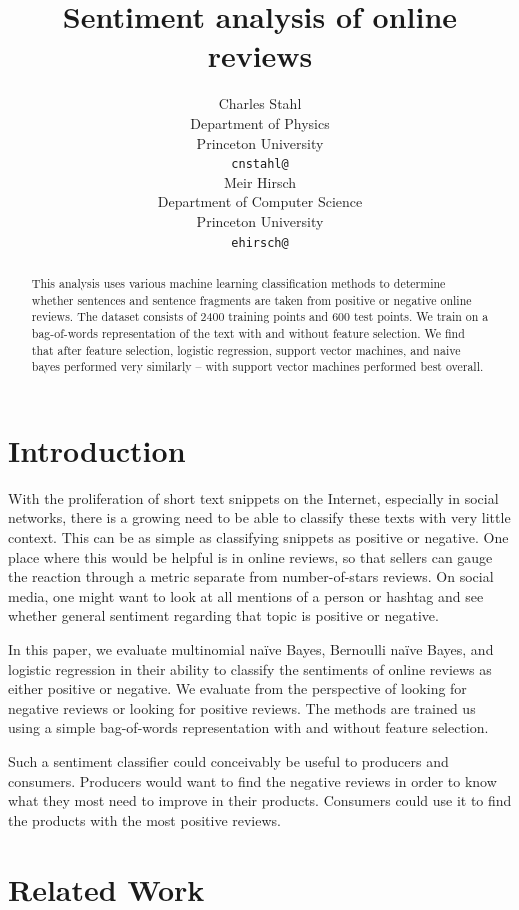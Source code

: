 \documentclass{article} %
\title{Sentiment analysis of online reviews}
\author{
	Charles Stahl\\
	Department of Physics\\
	Princeton University\\
	\texttt{cnstahl@} \\
	\And
	Meir Hirsch \\
	Department of Computer Science\\
	Princeton University \\
	\texttt{ehirsch@} \\
}
\begin{document}
	
	\maketitle
	
	\begin{abstract}
	This analysis uses various machine learning classification methods to determine whether sentences and sentence fragments are taken from positive or negative online reviews. The dataset consists of 2400 training points and 600 test points. We train on a bag-of-words representation of the text with and without feature selection. We find that after feature selection, logistic regression, support vector machines, and naive bayes performed very similarly – with support vector machines performed best overall. 
	\end{abstract}
	
	\section{Introduction}
	
	With the proliferation of short text snippets on the Internet, especially in social networks, there is a growing need to be able to classify these texts with very little context. This can be as simple as classifying snippets as positive or negative. One place where this would be helpful is in online reviews, so that sellers can gauge the reaction through a metric separate from number-of-stars reviews. On social media, one might want to look at all mentions of a person or hashtag and see whether general sentiment regarding that topic is positive or negative.
	
	In this paper, we evaluate multinomial na\"ive Bayes, Bernoulli na\"ive Bayes, and logistic regression in their ability to classify the sentiments of online reviews as either positive or negative. We evaluate from the perspective of looking for negative reviews or looking for positive reviews. The methods are trained us using a simple bag-of-words representation with and without feature selection. 
	
	Such a sentiment classifier could conceivably be useful to producers and consumers. Producers would want to find the negative reviews in order to know what they most need to improve in their products. Consumers could use it to find the products with the most positive reviews.
	
	\section{Related Work}
	
\end{document}
